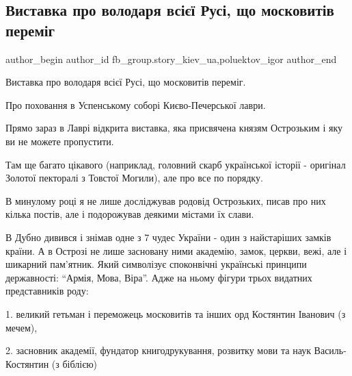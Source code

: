  
 
 
 
 
 
\subsection{Виставка про володаря всієї Русі, що московитів переміг}
\label{sec:13_01_2022.fb.fb_group.story_kiev_ua.1.vystavka_knjaz_ostrozhskij}
 
\ifcmt
 author_begin
   author_id fb_group.story_kiev_ua,poluektov_igor
 author_end
\fi

Виставка про володаря всієї Русі, що московитів переміг.

Про поховання в Успенському соборі Києво-Печерської лаври.

Прямо зараз в Лаврі відкрита виставка, яка присвячена князям Острозьким і яку
ви не можете пропустити. 

Там ще багато цікавого (наприклад, головний скарб української історії -
оригінал Золотої пекторалі з Товстої Могили), але про все по порядку.

В минулому році я не лише досліджував родовід Острозьких, писав про них кілька
постів, але і подорожував деякими містами їх слави.


В Дубно дивився і знімав одне з 7 чудес України - один з найстаріших замків
країни. А в Острозі не лише засновану ними академію, замок, церкви, вежі, але і
шикарний пам’ятник. Який символізує споконвічні українські принципи
державності: \enquote{Армія, Мова, Віра}. Адже на ньому фігури трьох видатних
представників роду:

1. великий гетьман і переможець московитів та інших орд Костянтин Іванович (з
мечем), 

2. засновник академії, фундатор книгодрукування, розвитку мови та наук
Василь-Костянтин (з біблією) 

